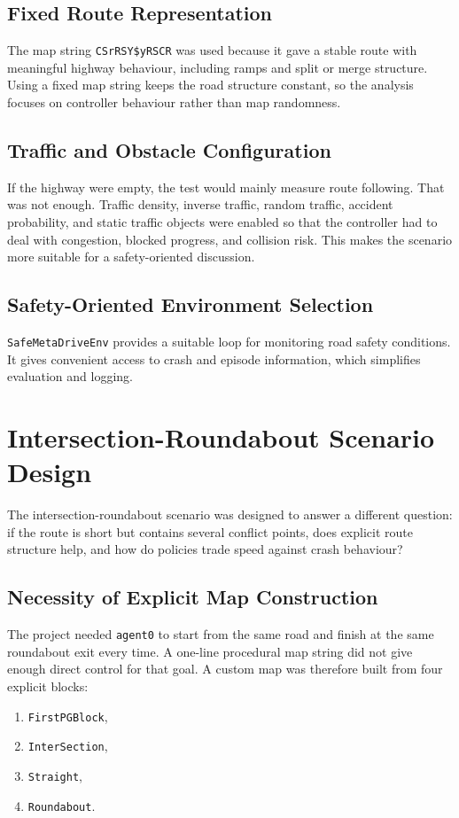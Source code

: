 \documentclass[12pt,a4paper]{report}
\begin{document}
\subsection{Fixed Route Representation}
The map string \texttt{CSrRSY\$yRSCR} was used because it gave a stable route with meaningful highway behaviour, including ramps and split or merge structure. Using a fixed map string keeps the road structure constant, so the analysis focuses on controller behaviour rather than map randomness.

\subsection{Traffic and Obstacle Configuration}
If the highway were empty, the test would mainly measure route following. That was not enough. Traffic density, inverse traffic, random traffic, accident probability, and static traffic objects were enabled so that the controller had to deal with congestion, blocked progress, and collision risk. This makes the scenario more suitable for a safety-oriented discussion.

\subsection{Safety-Oriented Environment Selection}
\texttt{SafeMetaDriveEnv} provides a suitable loop for monitoring road safety conditions. It gives convenient access to crash and episode information, which simplifies evaluation and logging.

\section{Intersection-Roundabout Scenario Design}
The intersection-roundabout scenario was designed to answer a different question: if the route is short but contains several conflict points, does explicit route structure help, and how do policies trade speed against crash behaviour?

\subsection{Necessity of Explicit Map Construction}
The project needed \texttt{agent0} to start from the same road and finish at the same roundabout exit every time. A one-line procedural map string did not give enough direct control for that goal. A custom map was therefore built from four explicit blocks:

\begin{enumerate}[label=\arabic*.]
    \item \texttt{FirstPGBlock},
    \item \texttt{InterSection},
    \item \texttt{Straight},
    \item \texttt{Roundabout}.
\end{enumerate}
\end{document}
